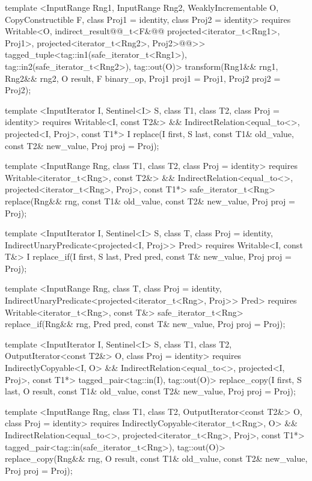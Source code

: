 {\begin{codeblock}
{{    template <InputRange Rng1, InputRange Rng2, WeaklyIncrementable O,
        CopyConstructible F, class Proj1 = identity, class Proj2 = identity>
      requires Writable<O, indirect_result@@_t<F&@\oldtxt{(}\newtxt{,}@
        projected<iterator_t<Rng1>, Proj1>, projected<iterator_t<Rng2>, Proj2>@\oldtxt{)}@>>
      tagged_tuple<tag::in1(safe_iterator_t<Rng1>),
                   tag::in2(safe_iterator_t<Rng2>),
                   tag::out(O)>
        transform(Rng1&& rng1, Rng2&& rng2, O result,
                  F binary_op, Proj1 proj1 = Proj1{}, Proj2 proj2 = Proj2{});

    template <InputIterator I, Sentinel<I> S, class T1, class T2, class Proj = identity>
      requires Writable<I, const T2&> &&
        IndirectRelation<equal_to<>, projected<I, Proj>, const T1*>
      I replace(I first, S last, const T1& old_value, const T2& new_value, Proj proj = Proj{});

    template <InputRange Rng, class T1, class T2, class Proj = identity>
      requires Writable<iterator_t<Rng>, const T2&> &&
        IndirectRelation<equal_to<>, projected<iterator_t<Rng>, Proj>, const T1*>
      safe_iterator_t<Rng>
        replace(Rng&& rng, const T1& old_value, const T2& new_value, Proj proj = Proj{});

    template <InputIterator I, Sentinel<I> S, class T, class Proj = identity,
        IndirectUnaryPredicate<projected<I, Proj>> Pred>
      requires Writable<I, const T&>
      I replace_if(I first, S last, Pred pred, const T& new_value, Proj proj = Proj{});

    template <InputRange Rng, class T, class Proj = identity,
        IndirectUnaryPredicate<projected<iterator_t<Rng>, Proj>> Pred>
      requires Writable<iterator_t<Rng>, const T&>
      safe_iterator_t<Rng>
        replace_if(Rng&& rng, Pred pred, const T& new_value, Proj proj = Proj{});

    template <InputIterator I, Sentinel<I> S, class T1, class T2, OutputIterator<const T2&> O,
        class Proj = identity>
      requires IndirectlyCopyable<I, O> &&
        IndirectRelation<equal_to<>, projected<I, Proj>, const T1*>
      tagged_pair<tag::in(I), tag::out(O)>
        replace_copy(I first, S last, O result, const T1& old_value, const T2& new_value,
                    Proj proj = Proj{});

    template <InputRange Rng, class T1, class T2, OutputIterator<const T2&> O,
        class Proj = identity>
      requires IndirectlyCopyable<iterator_t<Rng>, O> &&
        IndirectRelation<equal_to<>, projected<iterator_t<Rng>, Proj>, const T1*>
      tagged_pair<tag::in(safe_iterator_t<Rng>), tag::out(O)>
        replace_copy(Rng&& rng, O result, const T1& old_value, const T2& new_value,
                    Proj proj = Proj{});

}}
\end{codeblock}}
